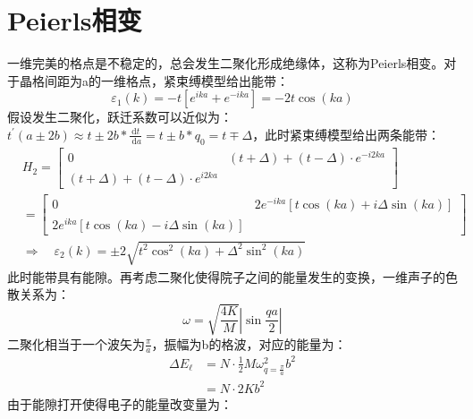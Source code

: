\documentclass[10pt,openany]{book}
\theoremstyle{thmstyle} %
\theoremstyle{defstyle} %
\theoremstyle{prostyle} %
\begin{document}
\section{Peierls相变}
一维完美的格点是不稳定的，总会发生二聚化形成绝缘体，这称为Peierls相变。对于晶格间距为a的一维格点，紧束缚模型给出能带：
\begin{equation}
	\varepsilon_1(k)=-t\left[e^{i k a}+e^{-i k a}\right]=-2 t \cos (k a)
\end{equation}
假设发生二聚化，跃迁系数可以近似为：$ t^{\prime}(a \pm 2 b) \approx t \pm 2 b * \frac{\mathrm{d} t}{\mathrm{~d} a}=t \pm b * q_0=t \mp \Delta $，此时紧束缚模型给出两条能带：
\begin{equation}
	\begin{aligned}
		& H_2= {\left[\begin{array}{cc}
		0 & (t+\Delta)+(t-\Delta) \cdot e^{-i 2 k a} \\
		(t+\Delta)+(t-\Delta) \cdot e^{i 2 k a}
		\end{array}\right] } \\
		&= {\left[\begin{array}{cc}
		0 & 2 e^{-i k a}[t \cos (k a)+i \Delta \sin (k a)] \\
		2 e^{i k a}[t \cos (k a)-i \Delta \sin (k a)]
		\end{array}\right] } \\
		& \Rightarrow \quad \varepsilon_2(k)= \pm 2 \sqrt{t^2 \cos ^2(k a)+\Delta^2 \sin ^2(k a)}
		\end{aligned}
\end{equation} 
此时能带具有能隙。再考虑二聚化使得院子之间的能量发生的变换，一维声子的色散关系为：
\begin{equation}
	\omega=\sqrt{\frac{4 K}{M}}\left|\sin \frac{q a}{2}\right|
\end{equation}
二聚化相当于一个波矢为$ \frac{\pi}{a} $，振幅为b的格波，对应的能量为：
\begin{equation}
	\begin{aligned}
		\Delta E_{\ell} & =N \cdot \frac{1}{2} M \omega_{q=\frac{\pi}{a}}^2 b^2 \\
		& =N \cdot 2 K b^2
		\end{aligned}
\end{equation} 
由于能隙打开使得电子的能量改变量为：
\end{document}
